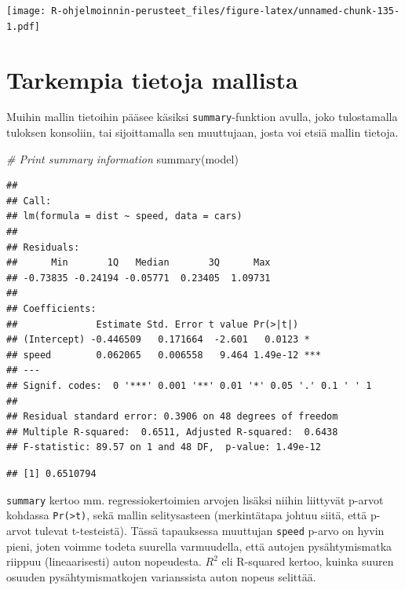 \documentclass[
]{book}
\newenvironment{Shaded}{\begin{snugshade}}{\end{snugshade}}
\newcommand{\CommentTok}[1]{\textcolor[rgb]{0.56,0.35,0.01}{\textit{#1}}}
\newcommand{\FunctionTok}[1]{\textcolor[rgb]{0.00,0.00,0.00}{#1}}
\newcommand{\NormalTok}[1]{#1}
\newcommand{\OtherTok}[1]{\textcolor[rgb]{0.56,0.35,0.01}{#1}}
\newcommand{\SpecialCharTok}[1]{\textcolor[rgb]{0.00,0.00,0.00}{#1}}
\begin{document}
\texttt{[image: R-ohjelmoinnin-perusteet\_files/figure-latex/unnamed-chunk-135-1.pdf]}

\hypertarget{tarkempia-tietoja-mallista}{%
\section{Tarkempia tietoja mallista}\label{tarkempia-tietoja-mallista}}

Muihin mallin tietoihin pääsee käsiksi \texttt{summary}-funktion avulla, joko tulostamalla tuloksen konsoliin, tai sijoittamalla sen muuttujaan, josta voi etsiä mallin tietoja.

\begin{Shaded}
\begin{Highlighting}[]
\CommentTok{\# Print summary information}
\FunctionTok{summary}\NormalTok{(model)}
\end{Highlighting}
\end{Shaded}

\begin{verbatim}
## 
## Call:
## lm(formula = dist ~ speed, data = cars)
## 
## Residuals:
##      Min       1Q   Median       3Q      Max 
## -0.73835 -0.24194 -0.05771  0.23405  1.09731 
## 
## Coefficients:
##              Estimate Std. Error t value Pr(>|t|)    
## (Intercept) -0.446509   0.171664  -2.601   0.0123 *  
## speed        0.062065   0.006558   9.464 1.49e-12 ***
## ---
## Signif. codes:  0 '***' 0.001 '**' 0.01 '*' 0.05 '.' 0.1 ' ' 1
## 
## Residual standard error: 0.3906 on 48 degrees of freedom
## Multiple R-squared:  0.6511, Adjusted R-squared:  0.6438 
## F-statistic: 89.57 on 1 and 48 DF,  p-value: 1.49e-12
\end{verbatim}

\begin{Shaded}
\end{Shaded}

\begin{verbatim}
## [1] 0.6510794
\end{verbatim}

\texttt{summary} kertoo mm. regressiokertoimien arvojen lisäksi niihin liittyvät p-arvot kohdassa \texttt{Pr(\textgreater{}\textbar{}t\textbar{})}, sekä mallin selitysasteen (merkintätapa johtuu siitä, että p-arvot tulevat t-testeistä). Tässä tapauksessa muuttujan \texttt{speed} p-arvo on hyvin pieni, joten voimme todeta suurella varmuudella, että autojen pysähtymismatka riippuu (lineaarisesti) auton nopeudesta. \(R^2\) eli R-squared kertoo, kuinka suuren osuuden pysähtymismatkojen varianssista auton nopeus selittää.
\end{document}
